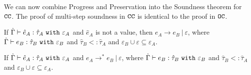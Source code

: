 We can now combine Progress and Preservation into the Soundness theorem for $\mathtt{CC}$. The proof of multi-step soundness in $\mathtt{CC}$ is identical to the proof in $\mathtt{OC}$.

\begin{theorem}[Soundness]
If $\hat \Gamma \vdash \hat e_A: \hat \tau_A~\mathtt{with}~ \varepsilon_A$ and $\hat e_A$ is not a value, then $e_A \longrightarrow e_B~|~\varepsilon$, where $\hat \Gamma \vdash e_B: \hat \tau_B~\mathtt{with}~ \varepsilon_B$ and $\hat \tau_B <: \hat \tau_A$ and $\varepsilon_B \cup \varepsilon \subseteq \varepsilon_A$.
\end{theorem}

\begin{theorem}
If $\hat \Gamma \vdash \hat e_A: \hat \tau_A~\mathtt{with}~ \varepsilon_A$ and $e_A \longrightarrow^{*} e_B~|~\varepsilon$, where $\hat \Gamma \vdash e_B: \hat \tau_B~\mathtt{with}~ \varepsilon_B$ and $\hat \tau_B <: \hat \tau_A$ and $\varepsilon_B \cup \varepsilon \subseteq \varepsilon_A$.
\end{theorem}







